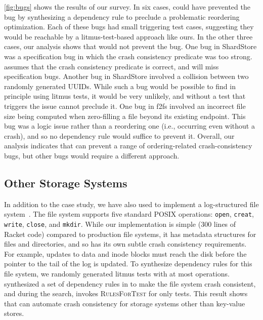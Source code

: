 \cref{fig:bugs} shows the results of our survey.
In six cases, \depsynth could have prevented the bug
by synthesizing a dependency rule to preclude a problematic reordering optimization.
Each of these bugs had small triggering test cases,
suggesting they would be reachable by a litmus-test-based approach like ours.
In the other three cases, our analysis shows that \depsynth would not prevent the bug.
One bug in ShardStore was a specification bug
in which the crash consistency predicate was too strong.
\depsynth assumes that the crash consistency predicate is correct,
and will miss specification bugs.
Another bug in ShardStore involved a collision between two randomly generated UUIDs.
While such a bug would be possible to find in principle using litmus tests,
it would be very unlikely,
and without a test that triggers the issue \depsynth cannot preclude it.
One bug in f2fs involved an incorrect file size being computed when zero-filling a file
beyond its existing endpoint.
This bug was a logic issue rather than a reordering one (i.e., occurring even without a crash),
and so no dependency rule would suffice to prevent it.
Overall, our analysis indicates
that \depsynth can prevent a range of ordering-related crash-consistency bugs,
but other bugs would require a different approach.

\subsection{Other Storage Systems}\label{sec:eval:other}

In addition to the \shardstore case study, %
we have also used \depsynth
to implement a log-structured file system~\cite{rosenblum:lfs}.
The file system supports five standard POSIX operations:
\texttt{open}, \texttt{creat}, \texttt{write}, \texttt{close}, and \texttt{mkdir}.
While our implementation is simple (300 lines of Racket code) compared to production file systems,
it has metadata structures for files and directories,
and so has its own subtle crash consistency requirements.
For example, updates to data and inode blocks must reach the
disk before the pointer to the tail of the log is updated.
To synthesize dependency rules for this file system,
we randomly generated \lfsinputtests{} litmus tests
with at most \lfsmaxops{} operations.
\depsynth synthesized a set of \lfsnumrules{} dependency rules
in \lfssynthesistime{} to make the file system crash consistent,
and during the search,
invokes \textsc{RulesForTest} for only \lfstestsused{} tests.
This result shows that \depsynth can automate crash consistency for storage systems other than key-value stores.

